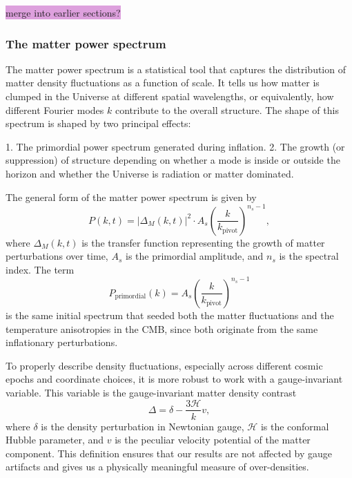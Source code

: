 \documentclass{aa}
\numberwithin{equation}{section}
\numberwithin{table}{section}
\numberwithin{figure}{section}
\begin{document}
\colorbox{Plum}{merge into earlier sections?}






\subsubsection{The matter power spectrum}
\color{Plum}
The matter power spectrum is a statistical tool that captures the distribution of matter density fluctuations as a function of scale. It tells us how matter is clumped in the Universe at different spatial wavelengths, or equivalently, how different Fourier modes $k$ contribute to the overall structure. The shape of this spectrum is shaped by two principal effects:

1. The primordial power spectrum generated during inflation.
2. The growth (or suppression) of structure depending on whether a mode is inside or outside the horizon and whether the Universe is radiation or matter dominated.

The general form of the matter power spectrum is given by
\begin{equation}
P(k, t) = |\Delta_M(k, t)|^2 \cdot A_s \left( \frac{k}{k_\text{pivot}} \right)^{n_s - 1},
\end{equation}
where $\Delta_M(k, t)$ is the transfer function representing the growth of matter perturbations over time, $A_s$ is the primordial amplitude, and $n_s$ is the spectral index. The term
\begin{equation}
P_\text{primordial}(k) = A_s \left( \frac{k}{k_\text{pivot}} \right)^{n_s - 1}
\end{equation}
is the same initial spectrum that seeded both the matter fluctuations and the temperature anisotropies in the CMB, since both originate from the same inflationary perturbations.

To properly describe density fluctuations, especially across different cosmic epochs and coordinate choices, it is more robust to work with a gauge-invariant variable. This variable is the gauge-invariant matter density contrast
\begin{equation}
\Delta = \delta - \frac{3\mathcal{H}}{k} v,
\end{equation}
where $\delta$ is the density perturbation in Newtonian gauge, $\mathcal{H}$ is the conformal Hubble parameter, and $v$ is the peculiar velocity potential of the matter component. This definition ensures that our results are not affected by gauge artifacts and gives us a physically meaningful measure of over-densities.
\end{document}
